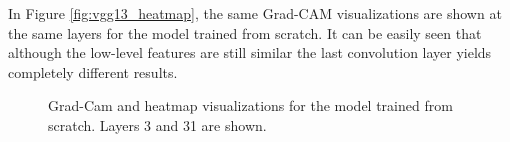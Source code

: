 \quad

In Figure \ref{fig:vgg13_heatmap}, the same Grad-CAM visualizations are shown at the same layers for the model trained from scratch. It can be easily seen that although the low-level features are still similar the last convolution layer yields completely different results. \\


\begin{figure}[!h]
\centering
\caption{Grad-Cam and heatmap visualizations for the model trained from scratch. Layers 3 and 31 are shown.}



\end{figure}
